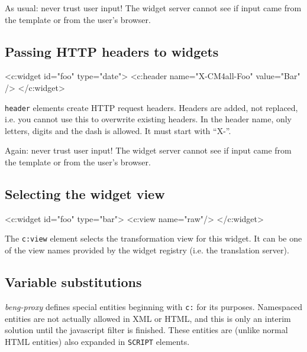\documentclass[a4paper,12pt]{article}
\begin{document}
As usual: never trust user input!  The widget server cannot see if
input came from the template or from the user's browser.

\subsection{Passing HTTP headers to widgets}

\begin{verbatim*}
<c:widget id="foo" type="date">
  <c:header name="X-CM4all-Foo" value="Bar" />
</c:widget>
\end{verbatim*}

\texttt{header} elements create HTTP request headers.  Headers are
added, not replaced, i.e. you cannot use this to overwrite existing
headers.  In the header name, only letters, digits and the dash is
allowed.  It must start with ``X-''.

Again: never trust user input!  The widget server cannot see if input
came from the template or from the user's browser.

\subsection{Selecting the widget view}

\begin{verbatim*}
<c:widget id="foo" type="bar">
  <c:view name="raw"/>
</c:widget>
\end{verbatim*}

The \texttt{c:view} element selects the transformation view for this
widget.  It can be one of the view names provided by the widget
registry (i.e. the translation server).

\subsection{Variable substitutions}
\label{entities}

\emph{beng-proxy} defines special entities beginning with \texttt{c:}
for its purposes.  Namespaced entities are not actually allowed in XML
or HTML, and this is only an interim solution until the javascript
filter is finished.  These entities are (unlike normal HTML entities)
also expanded in \texttt{SCRIPT} elements.
\end{document}
